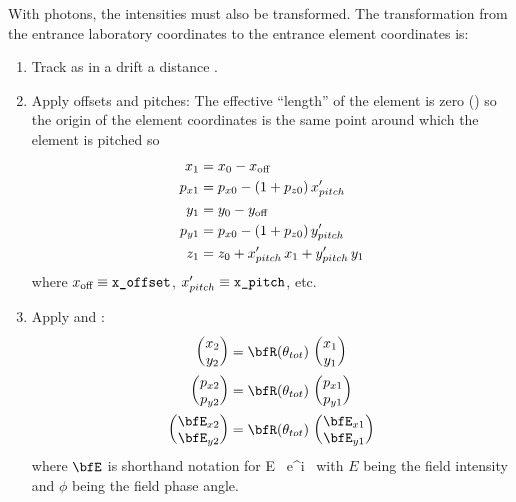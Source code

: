 With photons, the intensities must also be transformed.
The transformation from the entrance laboratory coordinates to
the entrance element coordinates is:
\begin{enumerate}
\item
Track as in a drift a distance .
\item
{}
Apply offsets and pitches: The effective ``length'' of the element is
zero () so the origin of the element coordinates
is the same point around which the element is pitched so
\begin{align}
  x_1    &= x_0 - x_{\text{off}} \nonumber \\
  p_{x1} &= p_{x0} - (1 + p_{z0}) \, x'_{pitch} \nonumber \\
  y_1    &= y_0 - y_{\text{off}} \\
  p_{y1} &= p_{x0} - (1 + p_{z0}) \, y'_{pitch} \nonumber \\
  z_1    &= z_0 + x'_{pitch} \, x_1 + y'_{pitch} \, y_1 \nonumber
\end{align}
where $x_{\text{off}} \equiv \vn{x_offset}$, $x'_{pitch} \equiv \vn{x_pitch}$, etc.
\item
Apply  and :
\begin{align}
  \begin{pmatrix} x_2 \\ y_2 \end{pmatrix} &=
    \bfR (\theta_{tot}) \,   
  \begin{pmatrix} x_1 \\ y_1 \end{pmatrix} \CRNO
  \begin{pmatrix} p_{x2} \\ p_{y2} \end{pmatrix} &=
    \bfR (\theta_{tot}) \, 
  \begin{pmatrix} p_{x1} \\ p_{y1} \end{pmatrix} \label{xyrtxy} \\ 
  \begin{pmatrix} \bfE_{x2} \\ \bfE_{y2} \end{pmatrix} &=
    \bfR (\theta_{tot}) \,   \begin{pmatrix} \bfE_{x1} \\ \bfE_{y1} \end{pmatrix} \nonumber
\end{align}
where $\bfE$ is shorthand notation for
\Begineq
  \bfE \equiv E \, e^{i \, \phi}
\Endeq
with $E$ being the field intensity and $\phi$ being the field phase angle.

\end{enumerate}

